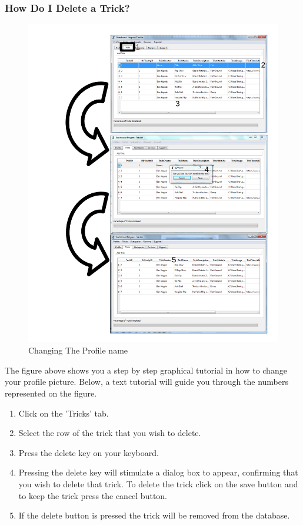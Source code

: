 \subsubsection{How Do I Delete a Trick?}

\begin{figure}[H]
    \includegraphics[width=\textwidth]{./Manual/Images/DeleteTrick.pdf}
    \caption{Changing The Profile name} \label{fig:Change Name}
\end{figure}

The figure above shows you a step by step graphical tutorial in how to change your profile picture. Below, a text tutorial will guide you through the numbers represented on the figure.

\begin{enumerate}
\item Click on the 'Tricks' tab.
\item Select the row of the trick that you wish to delete.
\item Press the delete key on your keyboard.
\item Pressing the delete key will stimulate a dialog box to appear, confirming that you wish to delete that trick. To delete the trick click on the save button and to keep the trick press the cancel button.
\item If the delete button is pressed the trick will be removed from the database.
\end{enumerate}

